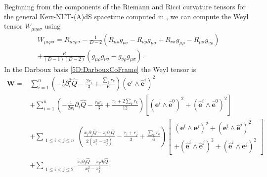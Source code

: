 Beginning from the components of the Riemann and Ricci curvature tensors for the general
Kerr-NUT-(A)dS spacetime computed in \cite{Hamamoto:2006zf}, we can compute the Weyl
tensor $ W_{\mu \nu \rho \sigma}$ using 
%
\begin{multline} \label{5D:WeylTensorFromRiemann} 
    W_{\mu \nu \rho \sigma} = R_{\mu \nu \rho \sigma} - \frac{1}{D-2}(R_{\mu \rho} g_{\nu
    \sigma} - R_{\nu \rho} g_{\mu \sigma} + R_{\nu \sigma} g_{\mu \rho} - R_{\mu\sigma}
    g_{\nu \rho})  \\ +\frac{R}{(D-1)(D-2)} (g_{\mu \rho} g_{\nu \sigma} - g_{\nu \rho}
    g_{\mu \sigma}).
\end{multline}
%
In the Darboux basis \eqref{5D:DarbouxCoFrame} the Weyl tensor is
%
\begin{equation} \label{5D:WeylInFormNotation5D} 
    \begin{split}
        \mathbf{W} = &\sum_{i=1}^{n} \left(- \frac{1}{2} \partial_{i}^{2} \hat{Q} -
                \frac{2r_{i}}{3} + \frac{\sum_{k}^{}r_{k}}{6}\right)\left(\mathbf{e}^{i}
        \wedge \mathbf{\hat{e}}^{i}\right)^{2} \\
                        &+ \sum_{i=1}^{n} \left( - \frac{1}{2x_i} \partial_i \hat{Q} - \frac{r_0
                        r_i}{3} + \frac{r_0 + 2\sum_k r_k}{12}\right)
                        \left[\left( \mathbf{e}^{i} \wedge \mathbf{\hat{e}}^{0}
                            \right)^{2} + \left( \mathbf{\hat{e}}^{i} \wedge
                    \mathbf{\hat{e}}^{0} \right)^{2} \right] \\
          &+  \sum_{ \substack{1 \leq i < j \leq n}}^{} \left(\frac{x_{j} \partial_{j} \hat{Q} - x_{i}
              \partial_{i}\hat{Q} }{2(x_{i}^{2} - x_{j}^{2})} - \frac{r_{i} + r_{j}}{3} +
              \frac{\sum_{k}^{}r_{k}}{6} \right)\begin{bmatrix}
                             \left(\mathbf{e}^{i} \wedge \mathbf{e}^{j}\right)^{2} +
                             \left(\mathbf{e}^{i} \wedge \hat{\mathbf{e}}^{j}\right)^{2}
                             \\
                             + \left(\hat{\mathbf{e}}^{i} \wedge
                             \hat{\mathbf{e}}^{j}\right)^{2} + \left(\hat{\mathbf{e}}^{i}
                         \wedge \mathbf{e}^{j}\right)^{2}
                         \end{bmatrix} \\
              &+  \sum_{ \substack{1 \leq i < j \leq 2}}^{} \frac{x_{i}
    \partial_{j} \hat{Q} - x_{j} \partial_{i} \hat{Q}}{x_{i}^{2} - x_{j}^2}

\end{split}
\end{equation}
